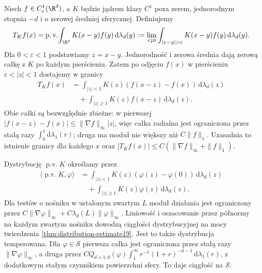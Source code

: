 \begin{definicja}
\label{def:dt-principal-value}
Niech $f\in C_c^1(\R^d)$, a $K$ będzie jądrem klasy $C^1$ poza
zerem, jednorodnym stopnia $-d$ i o zerowej średniej sferycznej.
Definiujemy
\[
 T_Kf(x)=\operatorname{p.v.}\!\int_{\R^d}K(x-y)f(y)\,\mathrm d\lambda_d(y)
 :=\lim_{\varepsilon\downarrow0}
 \int_{|x-y|>\varepsilon}K(x-y)f(y)\,\mathrm d\lambda_d(y).
\]
Dla $0<\varepsilon<1$ podstawiamy $z=x-y$.
Jednorodność i zerowa średnia dają zerową całkę z $K$
po każdym pierścieniu. Zatem po odjęciu $f(x)$
w pierścieniu $\varepsilon<|z|<1$ dostajemy w granicy
\[
 \begin{aligned}
 T_Kf(x)&=\int_{|z|<1}K(z)(f(x-z)-f(x))\,\mathrm d\lambda_d(z)\\
 &\quad+\int_{|z|\ge1}K(z)f(x-z)\,\mathrm d\lambda_d(z).
 \end{aligned}
\]
Obie całki są bezwzględnie zbieżne: w pierwszej
$|f(x-z)-f(x)|\le\|\nabla f\|_\infty |z|$,
więc całka radialna jest ograniczona przez stałą razy
$\int_0^1\mathrm d\lambda_1(r)$; druga ma moduł
nie większy niż $C\|f\|_1$. Uzasadnia to istnienie
granicy dla każdego $x$ oraz
$|T_Kf(x)|\le C(\|\nabla f\|_\infty+\|f\|_1)$.
\end{definicja}

Dystrybucję $\operatorname{p.v.}K$ określamy przez
\[
 \begin{aligned}
 \langle\operatorname{p.v.}K,\varphi\rangle
 &=\int_{|z|<1}K(z)(\varphi(z)-\varphi(0))\,\mathrm d\lambda_d(z)\\
 &\quad+\int_{|z|\ge1}K(z)\varphi(z)\,\mathrm d\lambda_d(z).
 \end{aligned}
\]
Dla testów o nośniku w ustalonym zwartym $L$ moduł
działania jest ograniczony przez
$C\|\nabla\varphi\|_\infty+C\lambda_d(L)\|\varphi\|_\infty$.
Liniowość i oszacowanie przez półnormy na każdym zwartym
nośniku dowodzą ciągłości dystrybucyjnej na mocy
twierdzenia \ref{thm:distribution-estimate19}.
Jest to także dystrybucja temperowana. Dla
$\varphi\in\mathcal S$ pierwsza całka jest ograniczona
przez stałą razy $\|\nabla\varphi\|_\infty$,
a druga przez
$C Q_{d+1,0}(\varphi)\int_1^\infty r^{-1}(1+r)^{-d-1}\,\mathrm d\lambda_1(r)$,
z dodatkowym stałym czynnikiem powierzchni sfery.
To daje ciągłość na $\mathcal S$.

